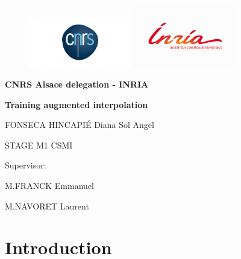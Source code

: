 \documentclass{article}
\begin{document}
\begin{titlepage}
\begin{figure} 
\includegraphics[width=0.4\textwidth]{images/cnrslogo.jpeg}
\includegraphics[width=0.4\textwidth]{images/inria.png}
    \centering
\end{figure}

\centering
\title{}\author{}\date{}
\centering
\vspace{3cm}
{\bfseries\LARGE CNRS Alsace delegation - INRIA \par}
\vspace{4cm}
{\bfseries\LARGE Training augmented interpolation \par}
\vspace{1cm}
{\Large FONSECA HINCAPIÉ Diana Sol Angel\par}
\vspace{1cm}
{\Large STAGE M1 CSMI \par}
\vspace{3cm}
{\Large Supervisor: \par}
\vspace{0.5cm}
{\Large M.FRANCK Emmanuel\par}
\vspace{0.5cm}
{\Large M.NAVORET Laurent\par}
\end{titlepage}


\maketitle
\tableofcontents 
\newpage






\section{Introduction}
\end{document}
